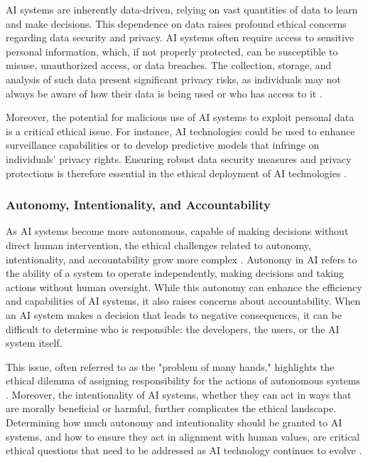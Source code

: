 AI systems are inherently data-driven, relying on vast quantities of data to learn and make decisions. This dependence on data raises profound ethical concerns regarding data security and privacy. AI systems often require access to sensitive personal information, which, if not properly protected, can be susceptible to misuse, unauthorized access, or data breaches. The collection, storage, and analysis of such data present significant privacy risks, as individuals may not always be aware of how their data is being used or who has access to it \cite{dilmaghani2019privacy}.

Moreover, the potential for malicious use of AI systems to exploit personal data is a critical ethical issue. For instance, AI technologies could be used to enhance surveillance capabilities or to develop predictive models that infringe on individuals' privacy rights. Ensuring robust data security measures and privacy protections is therefore essential in the ethical deployment of AI technologies \cite{huang2022overview}.

\subsubsection{Autonomy, Intentionality, and Accountability}

As AI systems become more autonomous, capable of making decisions without direct human intervention, the ethical challenges related to autonomy, intentionality, and accountability grow more complex \cite{sullins2011robot}. Autonomy in AI refers to the ability of a system to operate independently, making decisions and taking actions without human oversight. While this autonomy can enhance the efficiency and capabilities of AI systems, it also raises concerns about accountability. When an AI system makes a decision that leads to negative consequences, it can be difficult to determine who is responsible: the developers, the users, or the AI system itself.

This issue, often referred to as the "problem of many hands," highlights the ethical dilemma of assigning responsibility for the actions of autonomous systems \cite{timmermans2010ethics}. Moreover, the intentionality of AI systems, whether they can act in ways that are morally beneficial or harmful, further complicates the ethical landscape. Determining how much autonomy and intentionality should be granted to AI systems, and how to ensure they act in alignment with human values, are critical ethical questions that need to be addressed as AI technology continues to evolve \cite{huang2022overview}.

